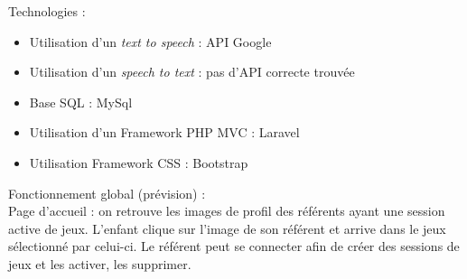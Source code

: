 \documentclass[12pt,a4paper]{report}
\begin{document}

\medbreak
Technologies :
\begin{itemize}
\item Utilisation d'un \emph{text to speech} : API Google
\item Utilisation d'un \emph{speech to text} : pas d'API correcte trouvée
\item Base SQL : MySql
\item Utilisation d'un Framework PHP MVC : Laravel
\item Utilisation Framework CSS : Bootstrap
\end{itemize}

\medbreak
Fonctionnement global (prévision) :
\\Page d'accueil : on retrouve les images de profil des référents ayant une session active de jeux.
L'enfant clique sur l'image de son référent et arrive dans le jeux sélectionné par celui-ci.
Le référent peut se connecter afin de créer des sessions de jeux et les activer, les supprimer.\\
\end{document}
